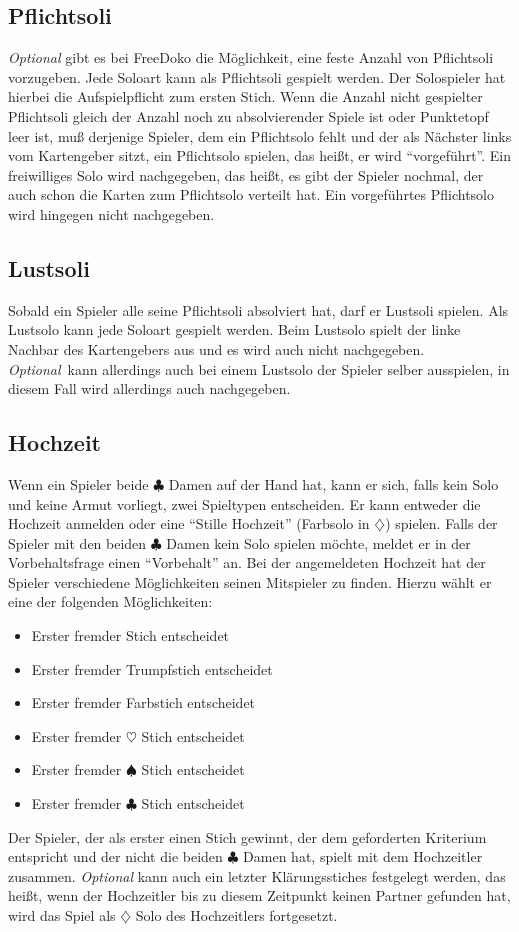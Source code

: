 \documentclass{scrartcl}
\newcommand{\kreuz}{$\clubsuit$\xspace}
\newcommand{\pik}{$\spadesuit$\xspace}
\newcommand{\herz}{$\heartsuit$\xspace}
\newcommand{\karo}{$\diamondsuit$\xspace}
\newcommand{\Optional}{\textit{Optional}\xspace}
\begin{document}
\subsection{Pflichtsoli}
\Optional gibt es bei FreeDoko die Möglichkeit, eine feste Anzahl von Pflichtsoli vorzugeben. Jede Soloart kann als Pflichtsoli gespielt werden. Der Solospieler hat hierbei die Aufspielpflicht zum ersten Stich. Wenn die Anzahl nicht gespielter Pflichtsoli gleich der Anzahl noch zu absolvierender Spiele ist oder Punktetopf leer ist, muß derjenige Spieler, dem ein Pflichtsolo fehlt und der als Nächster links vom Kartengeber sitzt, ein Pflichtsolo spielen, das heißt, er wird "`vorgeführt"'. Ein freiwilliges Solo wird nachgegeben, das heißt, es gibt der Spieler nochmal, der auch schon die Karten zum Pflichtsolo verteilt hat. Ein vorgeführtes Pflichtsolo wird hingegen nicht nachgegeben.

\subsection{Lustsoli}
Sobald ein Spieler alle seine Pflichtsoli absolviert hat, darf er Lustsoli spielen. Als Lustsolo kann jede Soloart gespielt werden.  Beim Lustsolo spielt der linke Nachbar des Kartengebers aus und es wird auch nicht nachgegeben. \Optional \ kann allerdings auch bei einem Lustsolo der Spieler selber ausspielen, in diesem Fall wird allerdings auch nachgegeben.

\subsection{Hochzeit}
Wenn ein Spieler beide \kreuz Damen auf der Hand hat, kann er sich, falls kein Solo und keine Armut vorliegt, zwei Spieltypen entscheiden. Er kann entweder die Hochzeit anmelden oder eine "`Stille Hochzeit"' (Farbsolo in \karo) spielen. Falls der Spieler mit den beiden \kreuz Damen kein Solo spielen möchte, meldet er in der Vorbehaltsfrage einen "`Vorbehalt"' an. Bei der angemeldeten Hochzeit hat der Spieler verschiedene Möglichkeiten seinen Mitspieler zu finden. Hierzu wählt er eine der folgenden Möglichkeiten:
\begin{itemize}
  \item Erster fremder Stich entscheidet
  \item Erster fremder Trumpfstich entscheidet
  \item Erster fremder Farbstich entscheidet
  \item Erster fremder \herz Stich entscheidet
  \item Erster fremder \pik Stich entscheidet
  \item Erster fremder \kreuz Stich entscheidet
\end{itemize}
Der Spieler, der als erster einen Stich gewinnt, der dem geforderten Kriterium entspricht und der nicht die beiden \kreuz Damen hat, spielt mit dem Hochzeitler zusammen. \Optional kann auch ein letzter Klärungsstiches festgelegt werden, das heißt, wenn der Hochzeitler bis zu diesem Zeitpunkt keinen Partner gefunden hat, wird das Spiel als \karo Solo des Hochzeitlers
fortgesetzt.
\end{document}
